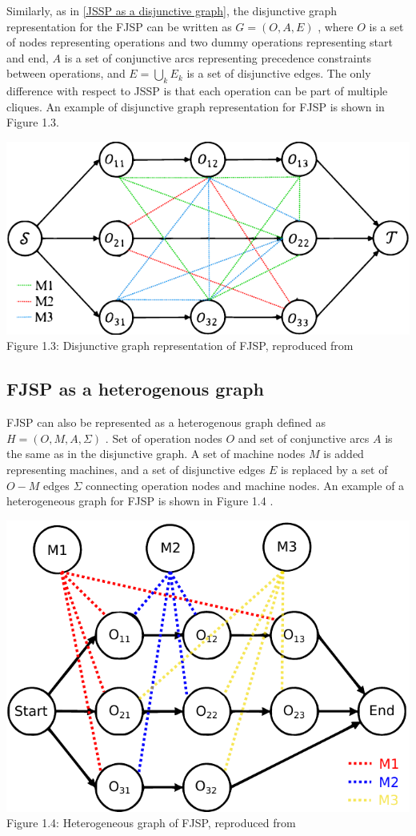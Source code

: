 Similarly, as in \ref{JSSP as a disjunctive graph}, the disjunctive graph representation for the FJSP can be written as $G = (O, A, E)$ \cite{Brandimarte_1993, 9826438, LEI2022117796}, where $O$ is a set of nodes representing operations and two dummy operations representing start and end, $A$ is a set of conjunctive arcs representing precedence constraints between operations, and $E = \bigcup_{k} E_k$ is a set of disjunctive edges. The only difference with respect to JSSP is that each operation can be part of multiple cliques. An example of disjunctive graph representation for FJSP is shown in Figure 1.3.
\begin{center}
    \includegraphics[width=0.75\linewidth]{images/fjsp_disjunctive_graph.pdf}\\
    Figure 1.3: Disjunctive graph representation of FJSP, reproduced from \cite{LEI2022117796}
\end{center}

\subsection{FJSP as a heterogenous graph} \label{FJSP as a heterogenous graph}

FJSP can also be represented as a heterogenous graph defined as $H = (O, M, A, \Sigma)$ \cite{9826438}. Set of operation nodes $O$ and set of conjunctive arcs $A$ is the same as in the disjunctive graph. A set of machine nodes $M$ is added representing machines, and a set of disjunctive edges $E$ is replaced by a set of $O-M$ edges $\Sigma$ connecting operation nodes and machine nodes. An example of a heterogeneous graph for FJSP is shown in Figure 1.4 \cite{9826438}.
\begin{center}
    \includegraphics[width=0.75\linewidth]{images/fjsp_heterogenous_graph.pdf}\\
    Figure 1.4: Heterogeneous graph of FJSP, reproduced from \cite{LEI2022117796}
\end{center}

